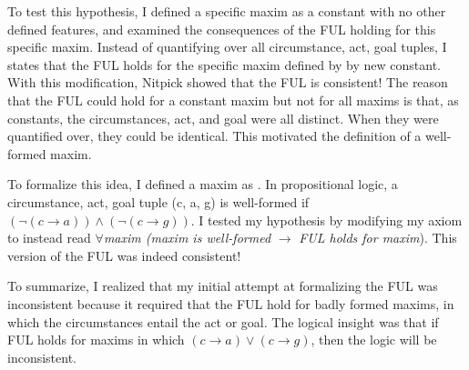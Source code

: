 \begin{isabellebody}
\begin{isamarkuptext}
To test this hypothesis, I defined a specific maxim as a constant with no other defined features, 
and examined the consequences of the FUL holding for this specific maxim. Instead of quantifying over
all circumstance, act, goal tuples, I states that the FUL holds for the specific maxim defined by
by new constant. With this modification, Nitpick showed that the FUL is consistent! The reason that
the FUL could hold for a constant maxim but not for all maxims is that, as constants, the 
circumstances, act, and goal were all distinct. When they were quantified over, 
they could be identical. This motivated the definition of a well-formed maxim. 

To formalize this idea, I defined a maxim as . In propositional
logic, a circumstance, act, goal tuple (c, a, g) is well-formed if $(\neg (c \longrightarrow a) ) \wedge 
(\neg(c \longrightarrow g))$. I tested my hypothesis by modifying my axiom to instead read $\forall$\emph{maxim
(maxim is well-formed} $\longrightarrow$ \emph{FUL holds for maxim}). This version of the FUL was indeed consistent!

To summarize, I realized that my initial attempt at formalizing the FUL was inconsistent because 
it required that the FUL hold for badly formed maxims, in which the circumstances entail the act or 
goal. The logical insight was that if FUL holds for maxims in which $(c \longrightarrow a) \vee 
(c \longrightarrow g)$, then the logic will be inconsistent.


\end{isamarkuptext}
\end{isabellebody}
